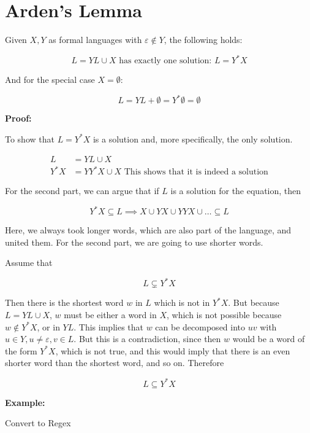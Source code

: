 \section{Arden's Lemma}

Given \(X, Y\) as formal languages with \(\varepsilon \notin Y\), the following holds:

\[
    L = YL \cup X \text{ has exactly one solution: } L = Y^*X
\]

And for the special case \(X = \emptyset\):

\[
L = YL + \emptyset = Y^* \emptyset = \emptyset
\]

\textbf{Proof:}

To show that \(L = Y^*X\) is a solution and, more specifically, the only solution.

\begin{align*}
    L &= YL \cup X\\
    Y^*X &= YY^*X \cup X \text{ This shows that it is indeed a solution}
\end{align*}

For the second part, we can argue that if \(L\) is a solution for the equation, then 

\[
    Y^*X \subseteq L \implies X \cup YX \cup YYX \cup \dots \subseteq L
\]

Here, we always took longer words, which are also part of the language, and united them. For the second 
part, we are going to use shorter words.

Assume that

\[
    L \subsetneq Y^*X 
\]

Then there is the shortest word \(w\) in \(L\) which is not in \(Y^*X\). But 
because \(L = YL \cup X\), \(w\) must be either a word in \(X\), which is not possible because 
\(w \notin Y^*X\), or in \(YL\). This implies that \(w\) can be decomposed into \(uv\) with 
\(u \in Y, u \neq \varepsilon, v \in L\). But this is a contradiction, since then \(w\) would be a word of the 
form \(Y^*X\), which is not true, and this would imply that there is an even shorter word than the shortest word, 
and so on. Therefore 

\[
    L \subseteq Y^*X  
\]

\QED

\textbf{Example:}

Convert to Regex

